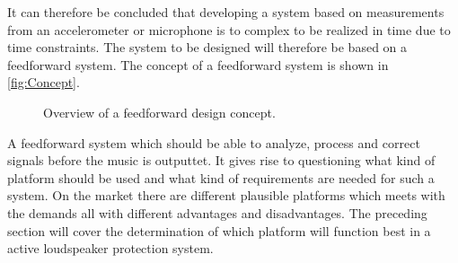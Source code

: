 It can therefore be concluded that developing a system based on measurements from an accelerometer or microphone is to complex to be realized in time due to time constraints. The system to be designed will therefore be based on a feedforward system. The concept of a feedforward system is shown in \autoref{fig:Concept}.

\begin{figure}[H]
\centering
{}
\scalebox{0.8}{
}
\caption{Overview of a feedforward design concept.}
\label{fig:Concept}
\end{figure}

A feedforward system which should be able to analyze, process and correct signals before the music is outputtet. It gives rise to questioning what kind of platform should be used and what kind of requirements are needed for such a system. On the market there are different plausible platforms which meets with the demands all with different advantages and disadvantages. The preceding section will cover the determination of which platform will function best in a active loudspeaker protection system. 

